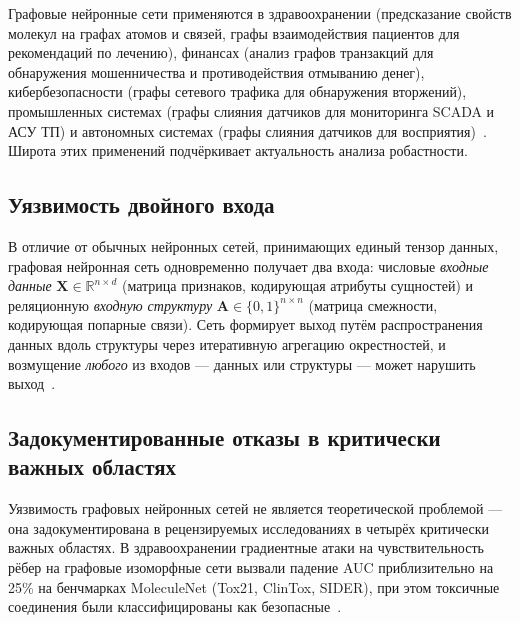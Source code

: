 Графовые нейронные сети применяются в здравоохранении (предсказание свойств молекул на графах атомов и связей, графы взаимодействия пациентов для рекомендаций по лечению), финансах (анализ графов транзакций для обнаружения мошенничества и противодействия отмыванию денег), кибербезопасности (графы сетевого трафика для обнаружения вторжений), промышленных системах (графы слияния датчиков для мониторинга SCADA и АСУ ТП) и автономных системах (графы слияния датчиков для восприятия)~\cite{Goodfellow2014gan,Gilmer2017,Gilmer2018,Ying2021,Wu2021,Luo2021}. Широта этих применений подчёркивает актуальность анализа робастности.

\subsection{Уязвимость двойного входа}

В отличие от обычных нейронных сетей, принимающих единый тензор данных, графовая нейронная сеть одновременно получает два входа: числовые \emph{входные данные} $\mathbf{X}\in\mathbb{R}^{n\times d}$ (матрица признаков, кодирующая атрибуты сущностей) и реляционную \emph{входную структуру} $\mathbf{A}\in\{0,1\}^{n\times n}$ (матрица смежности, кодирующая попарные связи). Сеть формирует выход путём распространения данных вдоль структуры через итеративную агрегацию окрестностей, и возмущение \emph{любого} из входов --- данных или структуры --- может нарушить выход~\cite{Zuegner2018,Bojchevski2019,Dai2018}.

\subsection{Задокументированные отказы в критически важных областях}

Уязвимость графовых нейронных сетей не является теоретической проблемой --- она задокументирована в рецензируемых исследованиях в четырёх критически важных областях. В здравоохранении градиентные атаки на чувствительность рёбер на графовые изоморфные сети вызвали падение AUC приблизительно на 25\% на бенчмарках MoleculeNet (Tox21, ClinTox, SIDER), при этом токсичные соединения были классифицированы как безопасные~\cite{EdgeSensitivity2025}.

\label{sec:ct_dynamics}%

